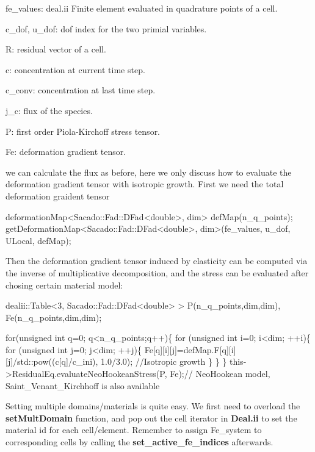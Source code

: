 fe\-\_\-values\-: deal.\-ii Finite element evaluated in quadrature points of a cell.

c\-\_\-dof, u\-\_\-dof\-: dof index for the two primial variables.

R\-: residual vector of a cell.

c\-: concentration at current time step.

c\-\_\-conv\-: concentration at last time step.

j\-\_\-c\-: flux of the species.

P\-: first order Piola-\/\-Kirchoff stress tensor.

Fe\-: deformation gradient tensor.





we can calculate the flux as before, here we only discuss how to evaluate the deformation gradient tensor with isotropic growth. First we need the total deformation graident tensor 
\begin{DoxyCode}
deformationMap<Sacado::Fad::DFad<double>, dim> defMap(n\_q\_points); 
getDeformationMap<Sacado::Fad::DFad<double>, dim>(fe\_values, u\_dof, ULocal, defMap);
\end{DoxyCode}
 Then the deformation gradient tensor induced by elasticity can be computed via the inverse of multiplicative decomposition, and the stress can be evaluated after chosing certain material model\-: 
\begin{DoxyCode}
dealii::Table<3, Sacado::Fad::DFad<double> > P(n\_q\_points,dim,dim), Fe(n\_q\_points,dim,dim);

\textcolor{keywordflow}{for}(\textcolor{keywordtype}{unsigned} \textcolor{keywordtype}{int} q=0; q<n\_q\_points;q++)\{
    \textcolor{keywordflow}{for} (\textcolor{keywordtype}{unsigned} \textcolor{keywordtype}{int} i=0; i<dim; ++i)\{
        \textcolor{keywordflow}{for} (\textcolor{keywordtype}{unsigned} \textcolor{keywordtype}{int} j=0; j<dim; ++j)\{
        Fe[q][i][j]=defMap.F[q][i][j]/std::pow((c[q]/c\_ini), 1.0/3.0); \textcolor{comment}{//Isotropic growth}
        \}
    \}
\}
this->ResidualEq.evaluateNeoHookeanStress(P, Fe);\textcolor{comment}{// NeoHookean model, Saint\_Venant\_Kirchhoff is also
       available }
\end{DoxyCode}
 Setting multiple domains/materials is quite easy. We first need to overload the {\bfseries set\-Mult\-Domain} function, and pop out the cell iterator in {\bfseries Deal.\-ii} to set the material id for each cell/element. Remember to assign Fe\-\_\-system to corresponding cells by calling the {\bfseries set\-\_\-active\-\_\-fe\-\_\-indices} afterwards. 
